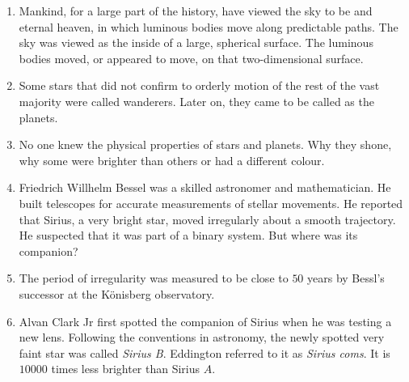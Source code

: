 \documentclass{article}
\begin{document}
\begin{enumerate}
\item Mankind, for a large part of the history, have viewed the sky to be 
and eternal heaven, in which luminous bodies move along predictable paths.
The sky was viewed as the inside of a large, spherical surface. The 
luminous bodies moved, or appeared to move, on that two-dimensional surface.

\item Some stars that did not confirm to orderly motion of the rest of the
vast majority were called wanderers. Later on, they came to be called as
the planets.

\item No one knew the physical properties of stars and planets. Why they 
shone, why some were brighter than others or had a different colour.

\item Friedrich Willhelm Bessel was a skilled astronomer and mathematician.
He built telescopes for accurate measurements of stellar movements. He 
reported that Sirius, a very bright star, moved irregularly about a smooth
trajectory. He suspected that it was part of a binary system. But where
was its companion?

\item The period of irregularity was measured to be close to $50$ years by
Bessl's successor at the K\"{o}nisberg observatory.

\item Alvan Clark Jr first spotted the companion of Sirius when he was 
testing a new lens. Following the conventions in astronomy, the newly 
spotted very faint star was called \emph{Sirius B}. Eddington referred to
it as \emph{Sirius coms}. It is $10000$ times less brighter than Sirius
$A$.
\end{enumerate}
\end{document}
